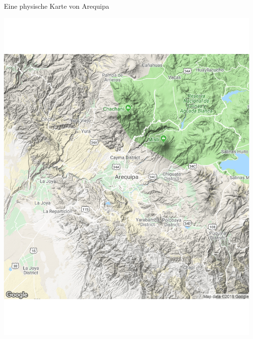 \documentclass[ignorenonframetext,]{beamer}
\begin{document}
\begin{frame}{Eine physische Karte von Arequipa}
\protect\hypertarget{eine-physische-karte-von-arequipa}{}

\includegraphics{figure/Areqipa.pdf}

\end{frame}
\end{document}
